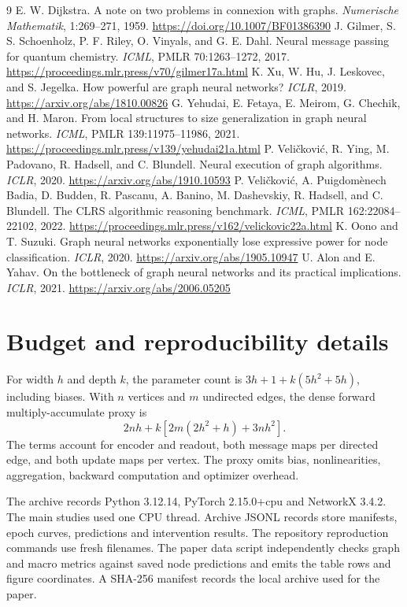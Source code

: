 \documentclass[11pt]{article}
\begin{document}
\begin{thebibliography}{9}
\setlength{\itemsep}{2pt}
\setlength{\parsep}{0pt}
 E. W. Dijkstra. A note on two problems in connexion with graphs. \emph{Numerische Mathematik}, 1:269--271, 1959. \url{https://doi.org/10.1007/BF01386390}
 J. Gilmer, S. S. Schoenholz, P. F. Riley, O. Vinyals, and G. E. Dahl. Neural message passing for quantum chemistry. \emph{ICML}, PMLR 70:1263--1272, 2017. \url{https://proceedings.mlr.press/v70/gilmer17a.html}
 K. Xu, W. Hu, J. Leskovec, and S. Jegelka. How powerful are graph neural networks? \emph{ICLR}, 2019. \url{https://arxiv.org/abs/1810.00826}
 G. Yehudai, E. Fetaya, E. Meirom, G. Chechik, and H. Maron. From local structures to size generalization in graph neural networks. \emph{ICML}, PMLR 139:11975--11986, 2021. \url{https://proceedings.mlr.press/v139/yehudai21a.html}
 P. Veli\v{c}kovi\'c, R. Ying, M. Padovano, R. Hadsell, and C. Blundell. Neural execution of graph algorithms. \emph{ICLR}, 2020. \url{https://arxiv.org/abs/1910.10593}
 P. Veli\v{c}kovi\'c, A. Puigdom\`enech Badia, D. Budden, R. Pascanu, A. Banino, M. Dashevskiy, R. Hadsell, and C. Blundell. The CLRS algorithmic reasoning benchmark. \emph{ICML}, PMLR 162:22084--22102, 2022. \url{https://proceedings.mlr.press/v162/velickovic22a.html}
 K. Oono and T. Suzuki. Graph neural networks exponentially lose expressive power for node classification. \emph{ICLR}, 2020. \url{https://arxiv.org/abs/1905.10947}
 U. Alon and E. Yahav. On the bottleneck of graph neural networks and its practical implications. \emph{ICLR}, 2021. \url{https://arxiv.org/abs/2006.05205}
\end{thebibliography}

\appendix
\section{Budget and reproducibility details}
For width \(h\) and depth \(k\), the parameter count is \(3h+1+k(5h^2+5h)\), including biases. With \(n\) vertices and \(m\) undirected edges, the dense forward multiply-accumulate proxy is
\[
2nh+k[2m(2h^2+h)+3nh^2].
\]
The terms account for encoder and readout, both message maps per directed edge, and both update maps per vertex. The proxy omits bias, nonlinearities, aggregation, backward computation and optimizer overhead.

The archive records Python 3.12.14, PyTorch 2.15.0+cpu and NetworkX 3.4.2. The main studies used one CPU thread. Archive JSONL records store manifests, epoch curves, predictions and intervention results. The repository reproduction commands use fresh filenames. The paper data script independently checks graph and macro metrics against saved node predictions and emits the table rows and figure coordinates. A SHA-256 manifest records the local archive used for the paper.
\end{document}
